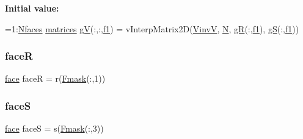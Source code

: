 {\bfseries Initial value\+:}
\begin{DoxyCode}
=1:\hyperlink{a01014_a65426726e39e9a3bb90febe7f32febdb}{Nfaces}
      \hyperlink{a00575_aa1d11ae751a4c689ad724854c407be92}{matrices}
        \hyperlink{a00473_a2a3aaeecb452e864ff43bf3a5050191a}{gV}(:,:,\hyperlink{a00473_a47dc4ee2bceaf5a9f6d47cb10353a96f}{f1}) = vInterpMatrix2D(\hyperlink{a00473_a8ef32285093ff36729ef70bb1e8149c4}{VinvV}, \hyperlink{a01014_a8a9fa6faadbf3c485ecdc832c0f78989}{N}, \hyperlink{a00473_acbf1a23eea93c85cd113589566865e49}{gR}(:,\hyperlink{a00473_a47dc4ee2bceaf5a9f6d47cb10353a96f}{f1}), \hyperlink{a00473_a51eed178703fb32c103fbb5565b564f1}{gS}(:,\hyperlink{a00473_a47dc4ee2bceaf5a9f6d47cb10353a96f}{f1}))
\end{DoxyCode}
\mbox{\label{a00473_af856be392aaad7451879584235d70695}} 
\subsubsection{\texorpdfstring{faceR}{faceR}}
{\footnotesize\ttfamily \hyperlink{a00611_ac4ec0037ba529da25bf084669a45f60c}{face} faceR = r(\hyperlink{a00575_a53fedbe0b7d30bbdae17dd4984fb3177}{Fmask}(\+:,1))}

\mbox{\label{a00473_ae20e10128affda41891e85c4eaf851be}} 
\subsubsection{\texorpdfstring{faceS}{faceS}}
{\footnotesize\ttfamily \hyperlink{a00611_ac4ec0037ba529da25bf084669a45f60c}{face} faceS = s(\hyperlink{a00575_a53fedbe0b7d30bbdae17dd4984fb3177}{Fmask}(\+:,3))}

\mbox{\label{a00473_ae0527cbfd56392d5095a691bbf10ba5b}} 
